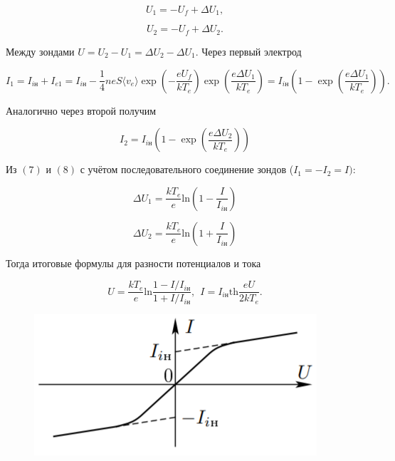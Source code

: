 \documentclass[a4paper,12pt]{article}
\begin{document}
\begin{equation*}
    U_1 = -U_f + \Delta U_1,
\end{equation*}


\begin{equation*}
    U_2 = -U_f + \Delta U_2.
\end{equation*}

Между зондами $U = U_2 - U_1 = \Delta U_2 - \Delta U_1$.
Через первый электрод

\begin{equation}
    I_1 = I_{i\text{н}} + I_{e1} = I_{i\text{н}} - \dfrac{1}{4}neS\langle v_e\rangle \exp\left(-\dfrac{eU_f}{kT_e}\right)\exp\left(\dfrac{e\Delta U_1}{kT_e}\right)=I_{i\text{н}}\left(1 - \exp\left( \dfrac{e\Delta U_1}{kT_e} \right)\right).
\end{equation}

Аналогично через второй получим

\begin{equation}
    I_2 = I_{i\text{н}}\left(1 - \exp\left( \dfrac{e\Delta U_2}{kT_e} \right)\right)
\end{equation}
	
Из $(7)$ и $(8)$ с учётом последовательного соединение зондов ($I_1 = -I_2 = I)$:

\begin{equation*}
    \Delta U_1= \dfrac{kT_e}{e}\text{ln}\left(1 - \dfrac{I}{I_{i\text{н}}}\right)
\end{equation*}

\begin{equation*}
    \Delta U_2= \dfrac{kT_e}{e}\text{ln}\left(1 + \dfrac{I}{I_{i\text{н}}}\right)
\end{equation*}

Тогда итоговые формулы для разности потенциалов и тока
	
\begin{equation}
    U = \dfrac{kT_e}{e}\text{ln}\dfrac{1 - I/I_{i\text{н}}}{1 + I/I_{i\text{н}}}, \ \
    I = I_{i\text{н}} \text{th}\dfrac{eU}{2kT_e}.
\end{equation}

\begin{figure}
    \includegraphics[scale=0.8]{vah-theory.png}
\end{figure}
\end{document}
